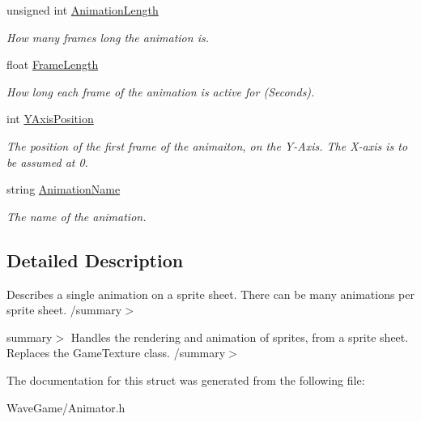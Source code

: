 \begin{DoxyCompactItemize}
\item 
\mbox{\label{struct_engine_1_1_core_1_1_animation_information_a83fdeb03d0a1a1ac0764ab87dde15455}} 
unsigned int \hyperlink{struct_engine_1_1_core_1_1_animation_information_a83fdeb03d0a1a1ac0764ab87dde15455}{Animation\+Length}
\begin{DoxyCompactList}\small\item\em How many frames long the animation is. \end{DoxyCompactList}\item 
\mbox{\label{struct_engine_1_1_core_1_1_animation_information_a50b291bafb36566f840985fd1e60bd0d}} 
float \hyperlink{struct_engine_1_1_core_1_1_animation_information_a50b291bafb36566f840985fd1e60bd0d}{Frame\+Length}
\begin{DoxyCompactList}\small\item\em How long each frame of the animation is active for (Seconds). \end{DoxyCompactList}\item 
\mbox{\label{struct_engine_1_1_core_1_1_animation_information_a3c8199af2bff3242f7d77cc3e1a2c28e}} 
int \hyperlink{struct_engine_1_1_core_1_1_animation_information_a3c8199af2bff3242f7d77cc3e1a2c28e}{Y\+Axis\+Position}
\begin{DoxyCompactList}\small\item\em The position of the first frame of the animaiton, on the Y-\/\+Axis. The X-\/axis is to be assumed at 0. \end{DoxyCompactList}\item 
\mbox{\label{struct_engine_1_1_core_1_1_animation_information_ad36ed64845916353c85fcfa6b29ba073}} 
string \hyperlink{struct_engine_1_1_core_1_1_animation_information_ad36ed64845916353c85fcfa6b29ba073}{Animation\+Name}
\begin{DoxyCompactList}\small\item\em The name of the animation. \end{DoxyCompactList}\end{DoxyCompactItemize}


\subsection{Detailed Description}
Describes a single animation on a sprite sheet. There can be many animations per sprite sheet. /summary$>$ 

summary$>$ Handles the rendering and animation of sprites, from a sprite sheet. Replaces the Game\+Texture class. /summary$>$ 

The documentation for this struct was generated from the following file\+:\begin{DoxyCompactItemize}
\item 
Wave\+Game/Animator.\+h\end{DoxyCompactItemize}
